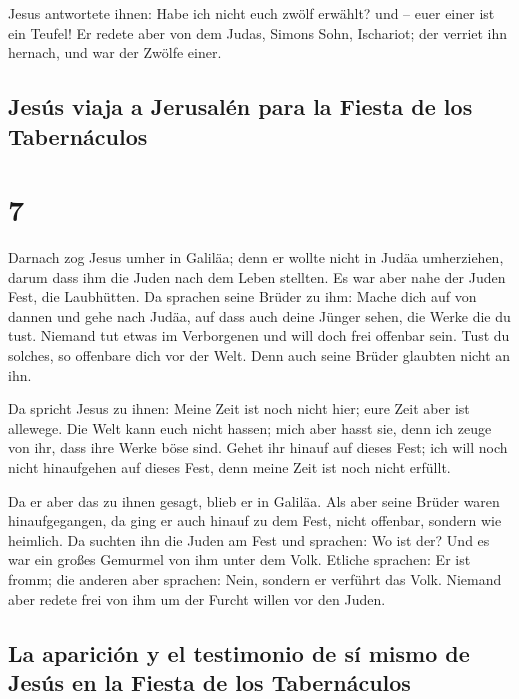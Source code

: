  Jesus antwortete ihnen: Habe ich nicht euch zwölf
erwählt? und -- euer einer ist ein Teufel!  Er redete
aber von dem Judas, Simons Sohn, Ischariot; der verriet ihn hernach, und
war der Zwölfe einer.

\hypertarget{jesuxfas-viaja-a-jerusaluxe9n-para-la-fiesta-de-los-tabernuxe1culos}{%
\subsection{Jesús viaja a Jerusalén para la Fiesta de los
Tabernáculos}\label{jesuxfas-viaja-a-jerusaluxe9n-para-la-fiesta-de-los-tabernuxe1culos}}

\hypertarget{section-6}{%
\section{7}\label{section-6}}

 Darnach zog Jesus umher in Galiläa; denn er wollte nicht
in Judäa umherziehen, darum dass ihm die Juden nach dem Leben stellten.
 Es war aber nahe der Juden Fest, die Laubhütten.
 Da sprachen seine Brüder zu ihm: Mache dich auf von
dannen und gehe nach Judäa, auf dass auch deine Jünger sehen, die Werke
die du tust.  Niemand tut etwas im Verborgenen und will
doch frei offenbar sein. Tust du solches, so offenbare dich vor der
Welt.  Denn auch seine Brüder glaubten nicht an ihn.

 Da spricht Jesus zu ihnen: Meine Zeit ist noch nicht
hier; eure Zeit aber ist allewege.  Die Welt kann euch
nicht hassen; mich aber hasst sie, denn ich zeuge von ihr, dass ihre
Werke böse sind.  Gehet ihr hinauf auf dieses Fest; ich
will noch nicht hinaufgehen auf dieses Fest, denn meine Zeit ist noch
nicht erfüllt.

 Da er aber das zu ihnen gesagt, blieb er in Galiläa.
 Als aber seine Brüder waren hinaufgegangen, da ging er
auch hinauf zu dem Fest, nicht offenbar, sondern wie heimlich.
 Da suchten ihn die Juden am Fest und sprachen: Wo ist
der?  Und es war ein großes Gemurmel von ihm unter dem
Volk. Etliche sprachen: Er ist fromm; die anderen aber sprachen: Nein,
sondern er verführt das Volk.  Niemand aber redete frei
von ihm um der Furcht willen vor den Juden.

\hypertarget{la-apariciuxf3n-y-el-testimonio-de-suxed-mismo-de-jesuxfas-en-la-fiesta-de-los-tabernuxe1culos}{%
\subsection{La aparición y el testimonio de sí mismo de Jesús en la
Fiesta de los
Tabernáculos}\label{la-apariciuxf3n-y-el-testimonio-de-suxed-mismo-de-jesuxfas-en-la-fiesta-de-los-tabernuxe1culos}}

